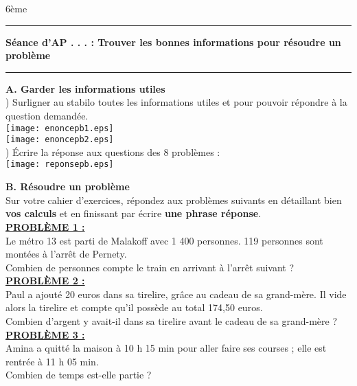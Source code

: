 \documentclass[a4paper,11pt]{article}
\newcounter{enumtabi}
\newcommand{\q}{\stepcounter{enumtabi} \theenumtabi)  }
\newcommand{\titre}[5] 
{
\noindent #2 \hfill #4 \\
#3 \hfill #5

\vspace{-1.6cm}

\begin{center}\rule{6cm}{0.5mm}\end{center}
\vspace{0.2cm}
\begin{center}{\large{\textbf{#1}}}\end{center}
\begin{center}\rule{6cm}{0.5mm}\end{center}
}
\begin{document}
\pagestyle{empty}
\titre{Séance d'AP . . . : Trouver les bonnes informations pour résoudre un problème}{}{}{6ème}{}


\vspace*{1cm}

{\large \textbf{A. Garder les informations utiles}}\\


\q Surligner au stabilo toutes les informations utiles et pour pouvoir répondre à la question demandée.\\

\texttt{[image: enoncepb1.eps]} \\

\texttt{[image: enoncepb2.eps]} \\

\q Écrire la réponse aux questions des 8 problèmes :\\

\texttt{[image: reponsepb.eps]} 

\newpage




{\large \textbf{B. Résoudre un problème}}\\

Sur votre cahier d'exercices, répondez aux problèmes suivants en détaillant bien \textbf{vos calculs} et en finissant par écrire \textbf{une phrase réponse}.\\

\underline{\textbf{PROBLÈME 1 : }}\\

Le métro 13 est parti de Malakoff avec 1 400 personnes. 119 personnes sont montées à l’arrêt de Pernety.\\
Combien de personnes compte le train en arrivant à l'arrêt suivant ?\\

\underline{\textbf{PROBLÈME 2 :} }\\


Paul a ajouté 20 euros dans sa tirelire, grâce au cadeau de sa grand-mère. Il vide alors la tirelire et compte qu'il possède au total 174,50 euros. \\
Combien d'argent y avait-il dans sa tirelire avant le cadeau de sa grand-mère ?\\


\underline{\textbf{PROBLÈME 3 :} }\\

Amina a quitté la maison à 10 h 15 min pour aller faire ses courses ; elle est rentrée à
11 h 05 min.\\
 Combien de
temps est-elle partie ? \\
\end{document}
